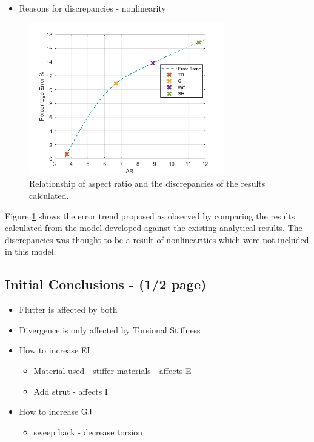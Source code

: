 \documentclass[11pt]{article}
\begin{document}
\begin{itemize}
    \item Reasons for discrepancies - nonlinearity
\end{itemize}

\begin{figure}
    \centering
    \includegraphics[width = 8.5cm]{figures/error-trend.png}
    \caption{Relationship of aspect ratio and the discrepancies of the results calculated.}
    \label{fig:error}
\end{figure}

Figure \ref{fig:error} shows the error trend proposed as observed by comparing the results calculated from the model developed against the existing analytical results. The discrepancies was thought to be a result of nonlinearities which were not included in this model.

\subsection{Initial Conclusions - (1/2 page)}
\begin{itemize}
    \item Flutter is affected by both
    \item Divergence is only affected by Torsional Stiffness
    \item How to increase EI
    \begin{itemize}
        \item Material used - stiffer materials - affects E
        \item Add strut - affects I
    \end{itemize}
    \item How to increase GJ
    \begin{itemize}
        \item sweep back - decrease torsion
    \end{itemize}
\end{itemize}
\end{document}

